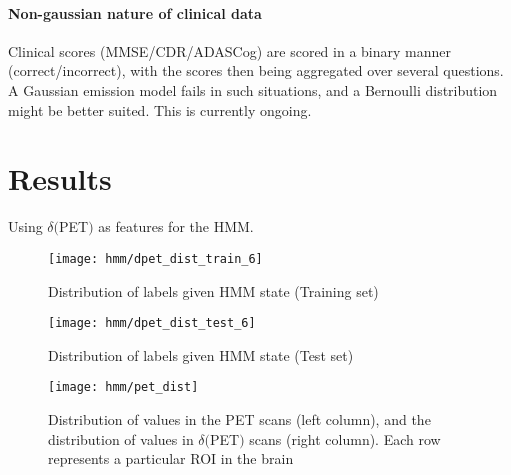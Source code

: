 \documentclass[12pt,a4paper]{article}
\begin{document}
\paragraph{Non-gaussian nature of clinical data}

Clinical scores (MMSE/CDR/ADAS\-Cog) are scored in a
binary manner (correct/incorrect), with the scores then being
aggregated over several questions. A Gaussian emission model fails in
such situations, and a Bernoulli distribution might be better
suited. This is currently ongoing.

\section{Results}
\label{sec:results}

Using $\delta ($PET$)$ as features for the HMM.

\begin{figure}[H]
  \centering
  \texttt{[image: hmm/dpet\_dist\_train\_6]}
  \caption{Distribution of labels given HMM state (Training set)}  
\end{figure}

\begin{figure}[H]
  \centering
  \texttt{[image: hmm/dpet\_dist\_test\_6]}
  \caption{Distribution of labels given HMM state (Test set)}  
\end{figure}

\begin{figure}[H]
  \centering
  \texttt{[image: hmm/pet\_dist]}
  \caption{Distribution of values in the PET scans (left column), and
    the distribution of values in $\delta ($PET$)$ scans (right
    column). Each row represents a particular ROI in the brain}
\end{figure}
\end{document}
